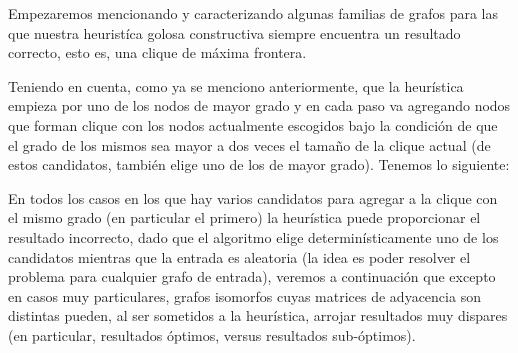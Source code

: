 Empezaremos mencionando y caracterizando algunas familias de grafos
para las que nuestra heurist\'ica golosa constructiva siempre encuentra
un resultado correcto, esto es, una clique de m\'axima frontera.

Teniendo en cuenta, como ya se menciono anteriormente, que la heur\'istica
empieza por uno de los nodos de mayor grado y en cada paso va 
agregando nodos que forman clique con los nodos actualmente escogidos
bajo la condici\'on de que el grado de los mismos sea mayor a dos veces
el tama\~no de la clique actual (de estos candidatos, tambi\'en elige
uno de los de mayor grado). Tenemos lo siguiente:

En todos los casos en los que hay varios candidatos para agregar a la
clique con el mismo grado (en particular el primero) la heur\'istica
puede proporcionar el resultado incorrecto, dado que el algoritmo
elige determin\'isticamente uno de los candidatos mientras que la 
entrada es aleatoria (la idea es poder resolver el problema para
cualquier grafo de entrada), veremos a continuaci\'on que excepto
en casos muy particulares, grafos isomorfos cuyas matrices de adyacencia
son distintas pueden, al ser sometidos a la heur\'istica, arrojar
resultados muy dispares (en particular, resultados \'optimos, versus
resultados sub-\'optimos).

